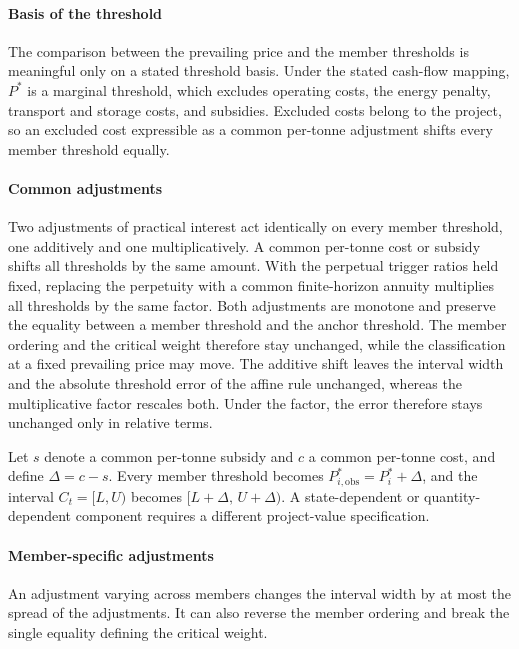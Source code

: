 \paragraph{Basis of the threshold} The comparison between the prevailing price and the member thresholds is meaningful only on a stated threshold basis. Under the stated cash-flow mapping, $P^{*}$ is a marginal threshold, which excludes operating costs, the energy penalty, transport and storage costs, and subsidies. Excluded costs belong to the project, so an excluded cost expressible as a common per-tonne adjustment shifts every member threshold equally.

\paragraph{Common adjustments} Two adjustments of practical interest act identically on every member threshold, one additively and one multiplicatively. A common per-tonne cost or subsidy shifts all thresholds by the same amount. With the perpetual trigger ratios held fixed, replacing the perpetuity with a common finite-horizon annuity multiplies all thresholds by the same factor. Both adjustments are monotone and preserve the equality between a member threshold and the anchor threshold. The member ordering and the critical weight therefore stay unchanged, while the classification at a fixed prevailing price may move. The additive shift leaves the interval width and the absolute threshold error of the affine rule unchanged, whereas the multiplicative factor rescales both. Under the factor, the error therefore stays unchanged only in relative terms.

Let $s$ denote a common per-tonne subsidy and $c$ a common per-tonne cost, and define $\Delta=c-s$. Every member threshold becomes $P^{*}_{i,\mathrm{obs}}=P^{*}_{i}+\Delta$, and the interval $C_t=[L,U)$ becomes $[L+\Delta,\,U+\Delta)$. A state-dependent or quantity-dependent component requires a different project-value specification.

\paragraph{Member-specific adjustments} An adjustment varying across members changes the interval width by at most the spread of the adjustments. It can also reverse the member ordering and break the single equality defining the critical weight.
